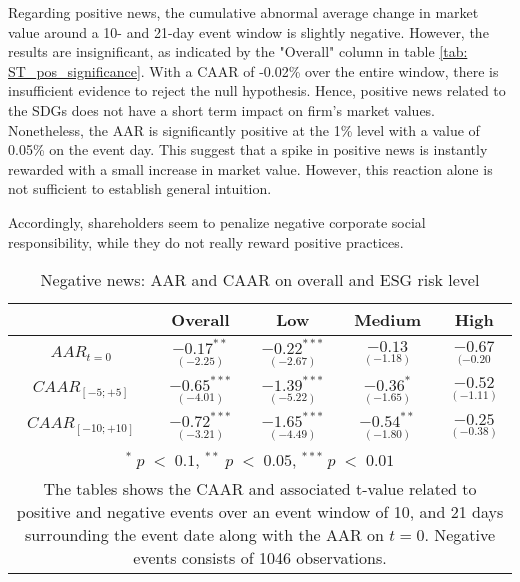 Regarding positive news, the cumulative abnormal average change in market value around a 10- and 21-day event window is slightly negative. However, the results are insignificant, as indicated by the "Overall" column in table \ref{tab: ST_pos_significance}. With a CAAR of -0.02\% over the entire window, there is insufficient evidence to reject the null hypothesis. Hence, positive news related to the SDGs does not have a short term impact on firm's market values. Nonetheless, the AAR is significantly positive at the 1\% level with a value of 0.05\% on the event day. This suggest that a spike in positive news is instantly rewarded with a small increase in market value. However, this reaction alone is not sufficient to establish general intuition.

Accordingly, shareholders seem to penalize negative corporate social responsibility, while they do not really reward positive practices. 

\begin{table}[H]
\centering
\caption{Negative news: AAR and CAAR on overall and ESG risk level} 
\begin{tabular}{ccccc}
  \hline  \hline
  & \multicolumn{1}{c}{Overall} &  \multicolumn{1}{c}{Low} & \multicolumn{1}{c}{Medium} & \multicolumn{1}{c}{High}\\  
 \hline
$AAR_{t=0}$ &   $\underset{(-2.25)}{-0.17^{**}}$ &   $\underset{(-2.67)}{-0.22^{***}}$ &   $\underset{(-1.18)}{-0.13}$ &   $\underset{(-0.20}{-0.67 }$ \\

$CAAR_{[-5;+5]}$  &  $\underset{(-4.01)}{-0.65^{***}}$ &   $\underset{(-5.22)}{-1.39^{***}}$ &   $\underset{(-1.65)}{-0.36^{*}}$ &   $\underset{(-1.11)}{-0.52}$ \\ 

$CAAR_{[-10;+10]}$    & $\underset{(-3.21)}{-0.72^{***}}$ &   $\underset{(-4.49)}{-1.65^{***}}$ &   $\underset{(-1.80)}{-0.54^{**}}$ &   $\underset{(-0.38)}{-0.25}$ \\ 
   \hline \hline
   \multicolumn{5}{p{12cm}}{ \footnotesize $^* \; p\; <\; 0.1$, $ ^{**} \; p\; <\; 0.05$, $ ^{***} \; p\; <\; 0.01$  } \\
   \multicolumn{5}{p{13cm}}{\footnotesize The tables shows the CAAR and associated t-value related to positive and negative events over an event window of 10, and 21 days surrounding the event date along with the AAR on $t=0$. Negative events consists of 1046 observations. } \\
   \hline
\end{tabular}
\label{tab: ST_neg_significance}
\end{table}

